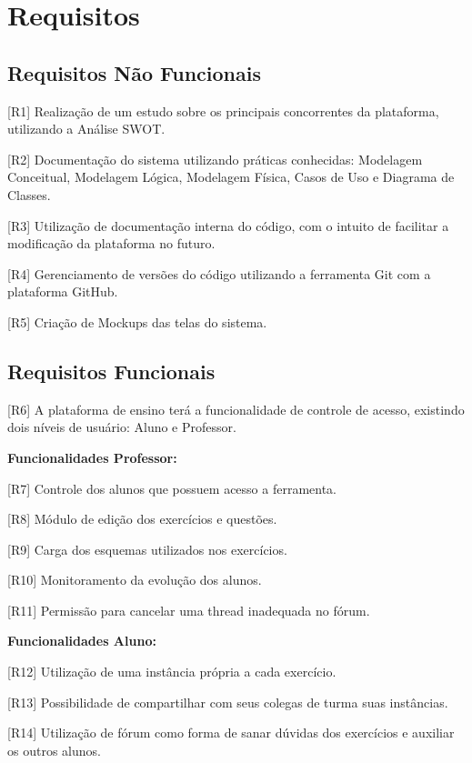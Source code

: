 \documentclass[graduacao,brazil]{ThesisPUC}
\begin{document}
\section{Requisitos}

\subsection{Requisitos N\~{a}o Funcionais}

[R1] Realiza\c{c}\~{a}o de um estudo sobre os principais concorrentes da plataforma, utilizando a An\'{a}lise SWOT.

[R2] Documenta\c{c}\~{a}o do sistema utilizando pr\'{a}ticas conhecidas: Modelagem Conceitual, Modelagem L\'{o}gica,
Modelagem F\'{i}sica, Casos de Uso e Diagrama de Classes.

[R3] Utiliza\c{c}\~{a}o de documenta\c{c}\~{a}o interna do c\'{o}digo, com o intuito de facilitar a modifica\c{c}\~{a}o da 
plataforma no futuro.

[R4] Gerenciamento de vers\~{o}es do c\'{o}digo utilizando a ferramenta Git com a plataforma GitHub.

[R5] Cria\c{c}\~{a}o de Mockups das telas do sistema.

\subsection{Requisitos Funcionais}

[R6] A plataforma de ensino ter\'{a} a funcionalidade de controle de acesso, existindo dois n\'{i}veis de usu\'{a}rio:
Aluno e Professor.

\textbf{Funcionalidades Professor:}

[R7] Controle dos alunos que possuem acesso a ferramenta.

[R8] M\'{o}dulo de edi\c{c}\~{a}o dos exerc\'{i}cios e quest\~{o}es.

[R9] Carga dos esquemas utilizados nos exerc\'{i}cios.

[R10] Monitoramento da evolu\c{c}\~{a}o dos alunos.

[R11] Permiss\~{a}o para cancelar uma thread inadequada no f\'{o}rum.

\textbf{Funcionalidades Aluno:}

[R12] Utiliza\c{c}\~{a}o de uma inst\^{a}ncia pr\'{o}pria a cada exerc\'{i}cio.

[R13] Possibilidade de compartilhar com seus colegas de turma suas inst\^{a}ncias.

[R14] Utiliza\c{c}\~{a}o de f\'{o}rum como forma de sanar d\'{u}vidas dos exerc\'{i}cios e auxiliar os outros alunos.
\end{document}
